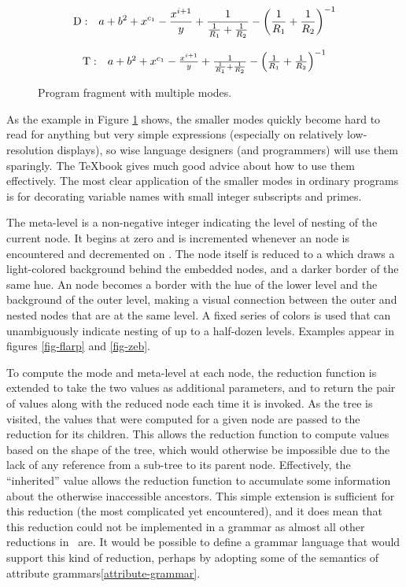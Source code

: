 \begin{figure}[h]
\begin{center}
\end{center}

$$
\mathrm{D:} \quad
a + b^2 + x^{c_1}
 - { x^{i+1} \over y }
 + { 1 \over { 1 \over R_1 }
 + { 1 \over R_2} }
 - \left({ 1 \over R_1 } + { 1 \over R_2}\right)^{-1}
$$

$$
\mathrm{T:} \quad
\textstyle
a + b^2 + x^{c_1}
 - { x^{i+1} \over y }
 + { 1 \over { 1 \over R_1 }
 + { 1 \over R_2} }
 - \left({ 1 \over R_1 } + { 1 \over R_2}\right)^{-1}
$$
\caption{\label{fig-modes} Program fragment with multiple modes.}
\end{figure}

As the example in Figure \ref{fig-modes} shows, the smaller modes quickly become hard to read for anything but very simple expressions (especially on relatively low-resolution displays), so wise language designers (and programmers) will use them sparingly. The \TeX book\cite{knuth} gives much good advice about how to use them effectively. The most clear application of the smaller modes in ordinary programs is for decorating variable names with small integer subscripts and primes.

The meta-level is a non-negative integer indicating the level of nesting of the current node. It begins at zero and is incremented whenever an  node is encountered and decremented on . The  node itself is reduced to a  which draws a light-colored background behind the embedded nodes, and a darker border of the same hue. An  node becomes a border with the hue of the lower level and the background of the outer level, making a visual connection between the outer and nested nodes that are at the same level. A fixed series of colors is used that can unambiguously indicate nesting of up to a half-dozen levels. Examples appear in figures \ref{fig-flarp} and \ref{fig-zeb}.

To compute the mode and meta-level at each node, the reduction function is extended to take the two values as additional parameters, and to return the pair of values along with the reduced node each time it is invoked. As the tree is visited, the values that were computed for a given node are passed to the reduction for its children. This allows the reduction function to compute values based on the shape of the tree, which would otherwise be impossible due to the lack of any reference from a sub-tree to its parent node. Effectively, the ``inherited'' value allows the reduction function to accumulate some information about the otherwise inaccessible ancestors. This simple extension is sufficient for this reduction (the most complicated yet encountered), and it does mean that this reduction could not be implemented in a grammar as almost all other reductions in \Meta\ are. It would be possible to define a grammar language that would support this kind of reduction, perhaps by adopting some of the semantics of attribute grammars\ref{attribute-grammar}.


